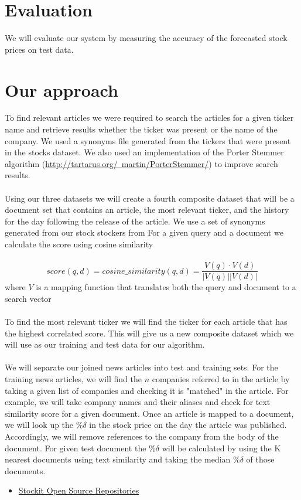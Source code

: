 \documentclass[11pt,letterpaper]{article}
\newcommand{\blue}[1]{\textcolor{RoyalBlue}{#1}}
\newcommand{\instructions}[1]{\blue{\textit{#1}}}
\renewcommand{\instructions}[1]{}
\begin{document}
\section*{Evaluation}
  We will evaluate our system by measuring the accuracy of the forecasted
  stock prices on test data.

\section*{Our approach}
To find relevant articles we were required to search the articles for a given ticker name and retrieve results whether the ticker was present or the name of the company.  We used a synonyms file generated from the tickers that were present in the stocks dataset. We also used an implementation of the Porter Stemmer algorithm (\href{http://tartarus.org/~martin/PorterStemmer/}{http://tartarus.org/~martin/PorterStemmer/}) to improve search results. \\ \\  
Using our three datasets we will create a fourth composite dataset that will be a document set that contains an article, the most relevant ticker, and the history for the day following the release of the article.  We use a set of synonyms generated from our stock stockers from   For a given query and a document we calculate the score using cosine similarity \\ \\ 
  \[ 
  	score(q,d) = cosine\_similarity(q,d) = \frac{ V(q) \cdot V(d) }{ | V(q) | | V(d) | } 
\]
where \(V\) is a mapping function that translates both the query and document to a search vector \\ \\
 To find the most relevant ticker we will find the ticker for each article that has the highest correlated score.  This will give us a new composite dataset which we will use as our training and test data for our algorithm. \\ \\
  We will separate our joined news articles into test and training sets. For the training news
  articles, we will find the $n$ companies referred to in the article by taking a given
  list of companies and checking it is "matched" in the article. For example, we will
  take company names and their aliases and check for text similarity score for a given
  document. Once an article is mapped to a document, we will look up the $\%\delta$ in
  the stock price on the day the article was published. Accordingly, we will remove references
  to the company from the body of the document. For given test document the $\%\delta$
  will be calculated by using the K nearest documents using text similarity
  and taking the median $\%\delta$ of those documents.
  \begin{itemize}
    \item \href{ https://github.com/stockit } { Stockit Open Source Repositories }
  \end{itemize}
\instructions{Describe how you want to tackle this task}
\end{document}
